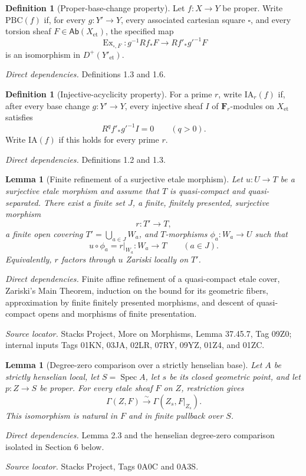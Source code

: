 \documentclass[10pt]{article}
\newtheorem{lemma}[theorem]{Lemma}
\theoremstyle{definition}
\newtheorem{definition}[theorem]{Definition}
\newcommand{\Ab}{\mathsf{Ab}}
\newcommand{\Spec}{\operatorname{Spec}}
\newcommand{\F}{\mathbf F}
\newcommand{\Dplus}{D^+}
\newcommand{\Et}{\mathrm{et}}
\newcommand{\Ex}{\operatorname{Ex}}
\newcommand{\deps}[1]{\par\smallskip\textit{Direct dependencies.} #1\par}
\newcommand{\sources}[1]{\par\textit{Source locator.} #1\par}
\begin{document}
\begin{definition}[Proper-base-change property]
Let $f:X\to Y$ be proper.  Write $\mathrm{PBC}(f)$ if, for every
$g:Y'\to Y$, every associated cartesian square $\square$, and every torsion
sheaf $F\in\Ab(X_{\Et})$, the specified map
\[
 \Ex_{\square,F}:g^{-1}Rf_*F\longrightarrow Rf'_*g'^{-1}F
\]
is an isomorphism in $\Dplus(Y'_{\Et})$.
\end{definition}
\deps{Definitions 1.3 and 1.6.}

\begin{definition}[Injective-acyclicity property]
For a prime $r$, write $\mathrm{IA}_r(f)$ if, after every base change
$g:Y'\to Y$, every injective sheaf $I$ of $\F_r$-modules on $X_{\Et}$
satisfies
\[
 R^qf'_*g'^{-1}I=0\qquad(q>0).
\]
Write $\mathrm{IA}(f)$ if this holds for every prime $r$.
\end{definition}
\deps{Definitions 1.2 and 1.3.}

\begin{lemma}[Finite refinement of a surjective etale morphism]
Let $u:U\to T$ be a surjective etale morphism and assume that $T$ is
quasi-compact and quasi-separated.  There exist a finite set $J$, a finite,
finitely presented, surjective morphism
\[
 r:T'\longrightarrow T,
\]
a finite open covering $T'=\bigcup_{a\in J}W_a$, and $T$-morphisms
$\phi_a:W_a\to U$ such that
\[
 u\circ\phi_a=r|_{W_a}:W_a\longrightarrow T
 \qquad(a\in J).
\]
Equivalently, $r$ factors through $u$ Zariski locally on $T'$.
\end{lemma}
\deps{Finite affine refinement of a quasi-compact etale cover, Zariski's
Main Theorem, induction on the bound for its geometric fibers,
approximation by finite finitely presented morphisms, and descent of
quasi-compact opens and morphisms of finite presentation.}
\sources{Stacks Project, More on Morphisms, Lemma 37.45.7, Tag 09Z0;
internal inputs Tags 01KN, 03JA, 02LR, 07RY, 09YZ, 01Z4, and 01ZC.}

\begin{lemma}[Degree-zero comparison over a strictly henselian base]
Let $A$ be strictly henselian local, let $S=\Spec A$, let $s$ be its closed
geometric point, and let $p:Z\to S$ be proper.  For every etale sheaf $F$
on $Z$, restriction gives
\[
 \Gamma(Z,F)\xrightarrow{\sim}\Gamma(Z_s,F|_{Z_s}).
\]
This isomorphism is natural in $F$ and in finite pullback over $S$.
\end{lemma}
\deps{Lemma 2.3 and the henselian degree-zero comparison isolated in
Section 6 below.}
\sources{Stacks Project, Tags 0A0C and 0A3S.}
\end{document}
